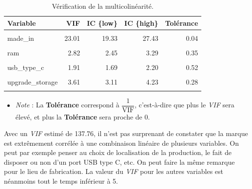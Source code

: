 \documentclass[
  12pt,
]{report}
\providecommand{\tightlist}{%
  \setlength{\itemsep}{0pt}\setlength{\parskip}{0pt}}\usepackage{longtable,booktabs,array}
\begin{document}
\begin{table}[!h]
\centering
\caption{\label{tab:collinearity_level}Vérification de la multicolinéarité.}
\centering
\begin{tabular}[t]{lrrrr}
\toprule
\textbf{Variable} & \textbf{VIF} & \textbf{IC \{low\}} & \textbf{IC \{high\}} & \textbf{Tolérance}\\
\midrule
\cellcolor{gray!10}{brand} & \cellcolor{gray!10}{137.76} & \cellcolor{gray!10}{115.29} & \cellcolor{gray!10}{164.65} & \cellcolor{gray!10}{0.01}\\
made\_in & 23.01 & 19.33 & 27.43 & 0.04\\
\cellcolor{gray!10}{storage} & \cellcolor{gray!10}{1.99} & \cellcolor{gray!10}{1.76} & \cellcolor{gray!10}{2.30} & \cellcolor{gray!10}{0.50}\\
ram & 2.82 & 2.45 & 3.29 & 0.35\\
\cellcolor{gray!10}{screen\_type} & \cellcolor{gray!10}{3.26} & \cellcolor{gray!10}{2.82} & \cellcolor{gray!10}{3.82} & \cellcolor{gray!10}{0.31}\\
\addlinespace
usb\_type\_c & 1.91 & 1.69 & 2.20 & 0.52\\
\cellcolor{gray!10}{battery} & \cellcolor{gray!10}{2.41} & \cellcolor{gray!10}{2.10} & \cellcolor{gray!10}{2.79} & \cellcolor{gray!10}{0.42}\\
upgrade\_storage & 3.61 & 3.11 & 4.23 & 0.28\\
\cellcolor{gray!10}{induction} & \cellcolor{gray!10}{3.80} & \cellcolor{gray!10}{3.27} & \cellcolor{gray!10}{4.45} & \cellcolor{gray!10}{0.26}\\
\bottomrule
\end{tabular}
\end{table}

\begin{itemize}
\tightlist
\item
  \emph{Note} : La \textbf{Tolérance} correspond à
  \(\dfrac{1}{\text{VIF}}\), c'est-à-dire que plus le \emph{VIF} sera
  élevé, et plus la \textbf{Tolérance} sera proche de 0.
\end{itemize}

\newpage

Avec un \emph{VIF} estimé de 137.76, il n'est pas surprenant de
constater que la marque est extrêmement corrélée à une combinaison
linéaire de plusieurs variables. On peut par exemple penser au choix de
localisation de la production, le fait de disposer ou non d'un port USB
type C, etc. On peut faire la même remarque pour le lieu de fabrication.
La valeur du \emph{VIF} pour les autres variables est néanmoins tout le
temps inférieur à 5.
\end{document}
